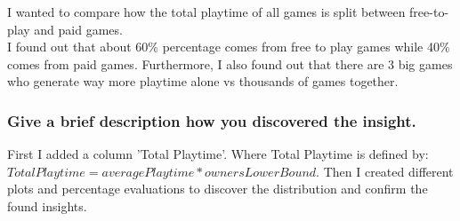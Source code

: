 \documentclass[11pt]{article}
\begin{document}
I wanted to compare how the total playtime of all games is split between free-to-play and paid games.\\
I found out that about 60\% percentage comes from free to play games while 40\% comes from paid games. Furthermore, I also found out that there are 3 big games who generate way more playtime alone vs thousands of games together. 

\subsubsection{Give a brief description how you discovered the
insight.}

First I added a column 'Total Playtime'. Where Total Playtime is defined by:
\smallbreak
$Total Playtime = average Playtime * owners Lower Bound.$
\smallbreak
Then I created different plots and percentage evaluations to discover the distribution and confirm the found insights. 
\end{document}
